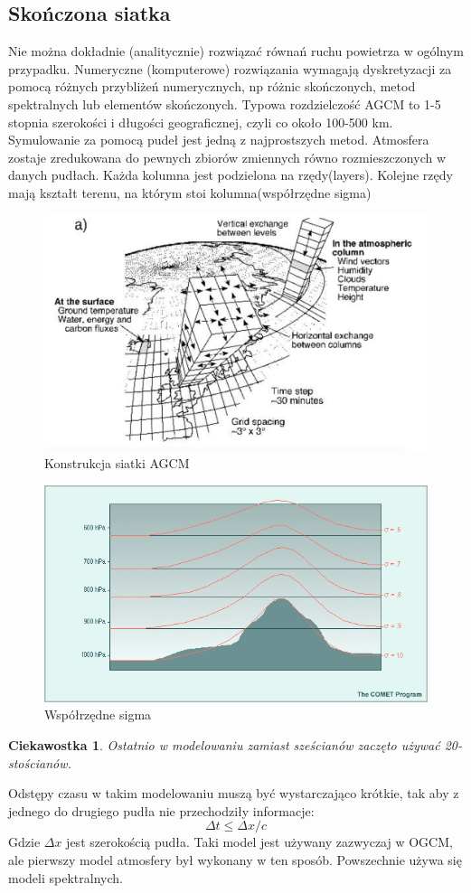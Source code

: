 \documentclass{article}
\theoremstyle{plain}
\newtheorem{ciekaw}{Ciekawostka}
\begin{document}
\subsection{Skończona siatka}
	Nie można dokładnie (analitycznie) rozwiązać równań ruchu powietrza w ogólnym przypadku. Numeryczne (komputerowe) rozwiązania wymagają dyskretyzacji za pomocą różnych przybliżeń numerycznych, np różnic skończonych, metod spektralnych lub elementów skończonych. Typowa rozdzielczość AGCM to 1-5 stopnia szerokości i długości geograficznej, czyli co około 100-500 km.
	Symulowanie za pomocą pudeł jest jedną z najprostszych metod. Atmosfera zostaje zredukowana do pewnych zbiorów zmiennych równo rozmieszczonych w danych pudłach. Każda kolumna jest podzielona na rzędy(layers). Kolejne rzędy mają kształt terenu, na którym stoi kolumna(współrzędne sigma)
\begin{figure}[h!]
\begin{center}
	\includegraphics[width=0.7\linewidth]{images/Figure3}
	\caption{Konstrukcja siatki AGCM}
\end{center}
\end{figure}
\begin{figure}[h!]
\begin{center}
	\includegraphics[width=0.7\linewidth]{images/Figure4}
	\caption{Współrzędne sigma}
\end{center}
\end{figure}
\begin{ciekaw}
	Ostatnio w modelowaniu zamiast sześcianów zaczęto używać 20-stościanów.
\end{ciekaw}
Odstępy czasu w takim modelowaniu muszą być wystarczająco krótkie, tak aby z jednego do drugiego pudła nie przechodziły informacje:
\begin{equation}
	\Delta t \le \Delta x/c
\end{equation}
Gdzie $\Delta x$ jest szerokością pudła. 
Taki model jest używany zazwyczaj w OGCM, ale pierwszy model atmosfery był wykonany w ten sposób. Powszechnie używa się modeli spektralnych.
\end{document}
